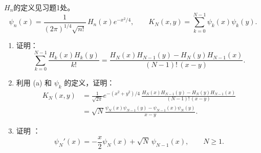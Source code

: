 \begin{5}
    $H_n$的定义见习题1处。
\[
\psi_n(x)
= \frac{1}{(2\pi)^{1/4}\sqrt{n!}}\,H_n(x)e^{-x^{2}/4},
\qquad
K_N(x,y) = \sum_{k=0}^{N-1} \psi_k(x)\psi_k(y).
\]

\begin{enumerate}
  \item[(a)] 证明：
  \[
  \sum_{k=0}^{N-1} \frac{H_k(x)H_k(y)}{k!}
  = \frac{H_N(x)H_{N-1}(y)-H_N(y)H_{N-1}(x)}{(N-1)!\,(x-y)}.
  \]
  \item[(b)] 利用 (a) 和 $\psi_k$ 的定义，证明：
  \[
  \begin{aligned}
  K_N(x,y)
  & = \frac{1}{\sqrt{2\pi}}e^{-(x^{2}+y^{2})/4}\,
    \frac{H_N(x)H_{N-1}(y)-H_N(y)H_{N-1}(x)}{(N-1)!\,(x-y)} \\
  & = \sqrt{N} \frac{\psi_N(x)\psi_{N-1}(y)-\psi_{N-1}(x)\psi_N(y)}{x-y}.
  \end{aligned}
  \]
  \item[(c)] 证明 ：
  \[
  \psi_N'(x) = -\frac{x}{2}\psi_N(x) + \sqrt{N}\,\psi_{N-1}(x),
  \qquad N\ge 1.
  \]
\end{enumerate}
\end{5}
